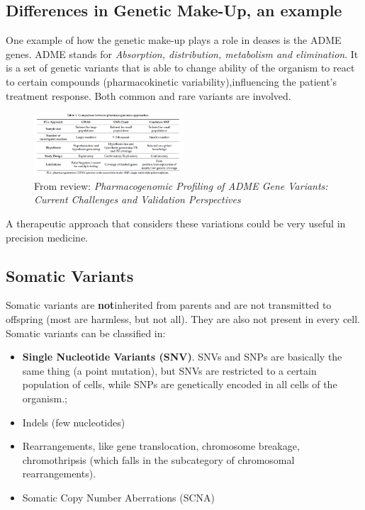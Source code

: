\subsection{Differences in Genetic Make-Up, an example}
One example of how the genetic make-up plays a role in deases is the ADME genes. 
ADME stands for \textit{Absorption, distribution, metabolism and elimination}. 
It is a set of genetic variants that is able to change ability of the organism to react to certain compounds (pharmacokinetic variability),influencing the patient's treatment response. Both common and rare variants are involved.

\begin{figure}[H]
    \centering
    \includegraphics[width=0.5\textwidth]{ADME.png}
    \caption{From review: \textit{Pharmacogenomic Profiling of ADME Gene Variants:
Current Challenges and Validation Perspectives}}
\end{figure}

A therapeutic approach that considers these variations could be very useful in precision medicine.

\subsection{Somatic Variants}
Somatic variants are \textbf{not}inherited from parents and are not transmitted to offspring (most are harmless, but not all). They are also not present in every cell.\\
Somatic variants can be classified in:

\begin{itemize}
\item \textbf{Single Nucleotide Variants (SNV)}. SNVs and SNPs are basically the same thing (a point mutation), but SNVs are restricted to a certain population of cells, while SNPs are genetically encoded in all cells of the organism.; 
\item Indels (few nucleotides)
\item Rearrangements, like gene translocation, chromosome breakage, chromothripsis (which falls in the subcategory of chromosomal rearrangements).
\item Somatic Copy Number Aberrations (SCNA) 
\end{itemize}


